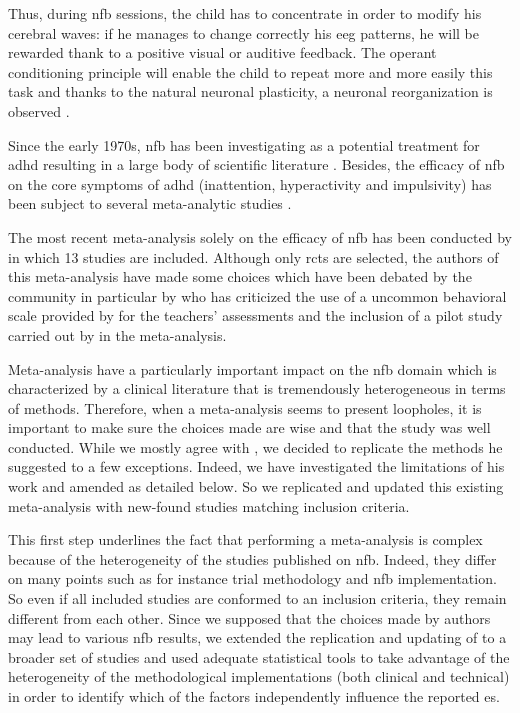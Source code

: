 Thus, during \gls{nfb} sessions, the child has to concentrate in order to modify his cerebral waves: 
if he manages to change correctly his \gls{eeg} patterns, he will be rewarded thank to 
a positive visual or auditive feedback. The operant conditioning principle will enable the 
child to repeat more and more easily this task and thanks to the natural neuronal plasticity,
 a neuronal reorganization is observed \citep{VanDoren2017}. 

Since the early 1970s, \gls{nfb} has been investigating as a potential treatment for \gls{adhd} resulting 
in a large body of scientific literature \citep{Lubar1976, Rossiter1995, Linden1996, Maurizio2014}.
Besides, the efficacy of \gls{nfb} on the core symptoms of \gls{adhd} (inattention, hyperactivity and 
impulsivity) has been subject to several meta-analytic studies \citep{Loo2005, Lofthouse2012, Arns2009, Micoulaud2014, 
Sonuga-Barke2013}.   

The most recent meta-analysis solely on the efficacy of \gls{nfb} has been conducted by \citet{Cortese2016} in 
which 13 studies are included. Although only \gls{rcts} are selected, the authors of 
this meta-analysis have made some choices which have been debated by the community in particular by 
\citet{Micoulaud2016} who has criticized the use of a uncommon behavioral scale provided by \citet{Steiner2014}
 for the teachers' assessments and the inclusion of a pilot study carried out by \citet{Arnold2014} in the meta-analysis. 

Meta-analysis have a particularly important impact on the \gls{nfb} domain which is 
characterized by a clinical literature that is tremendously heterogeneous in terms 
of methods. Therefore, when a meta-analysis seems to present loopholes, it is important to
 make sure the choices made are wise and that the study was well conducted. 
While we mostly agree with \citet{Cortese2016}, we decided to replicate the methods he suggested
 to a few exceptions. Indeed, we have investigated the limitations
 of his work and amended as detailed below. So we replicated and updated this existing meta-analysis 
with new-found studies matching \citet{Cortese2016} inclusion criteria.  

This first step underlines the fact that performing a meta-analysis is complex because of the heterogeneity 
of the studies published on \gls{nfb}. Indeed, they differ on many points such as for instance trial
 methodology and \gls{nfb} implementation. So even if all included studies are conformed to an 
inclusion criteria, they remain different from each other. Since we supposed 
that the choices made by authors may lead to various \gls{nfb} results, we extended the replication 
and updating of \citet{Cortese2016} to a broader set of studies and used 
adequate statistical tools to take advantage of the heterogeneity of the methodological implementations 
(both clinical and technical) in order to identify which of the factors 
independently influence the reported \gls{es}. 






